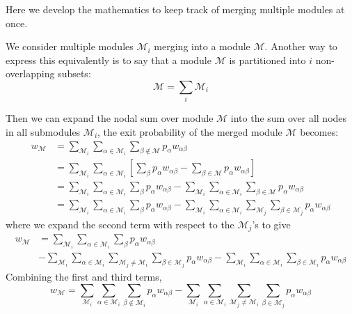 \documentclass[12pt,a4paper]{article}
\begin{document}
Here we develop the mathematics to keep track of merging multiple modules at once.

We consider multiple modules \(\mathcal{M}_i\) merging into a module \(\mathcal{M}\). Another way to express this equivalently is to say that a module \(\mathcal{M}\) is partitioned into \(i\) non-overlapping subsets:
\begin{equation}
    \mathcal{M} = \sum_i \mathcal{M}_i
\end{equation}

Then we can expand the nodal sum over module \(\mathcal{M}\) into the sum over all nodes in all submodules \(\mathcal{M}_i\), the exit probability of the merged module \(\mathcal{M}\) becomes:
\begin{align}
    w_\mathcal{M} &= \sum_{\mathcal{M}_i} \sum_{\alpha\in\mathcal{M}_i} \sum_{\beta\notin\mathcal{M}} p_\alpha w_{\alpha\beta} \\
    &= \sum_{\mathcal{M}_i} \sum_{\alpha\in\mathcal{M}_i} \left[ \sum_\beta p_\alpha w_{\alpha\beta} -\sum_{\beta\in\mathcal{M}} p_\alpha w_{\alpha\beta} \right] \\
    &= \sum_{\mathcal{M}_i} \sum_{\alpha\in\mathcal{M}_i} \sum_\beta p_\alpha w_{\alpha\beta} -\sum_{\mathcal{M}_i} \sum_{\alpha\in\mathcal{M}_i} \sum_{\beta\in\mathcal{M}} p_\alpha w_{\alpha\beta} \\
    &= \sum_{\mathcal{M}_i} \sum_{\alpha\in\mathcal{M}_i} \sum_\beta p_\alpha w_{\alpha\beta} -\sum_{\mathcal{M}_i} \sum_{\alpha\in\mathcal{M}_i} \sum_{\mathcal{M}_j}\sum_{\beta\in\mathcal{M}_j} p_\alpha w_{\alpha\beta}
\end{align}
where we expand the second term with respect to the \(\mathcal{M}_j\)'s to give
\begin{align}
    w_\mathcal{M} &= \sum_{\mathcal{M}_i} \sum_{\alpha\in\mathcal{M}_i} \sum_\beta p_\alpha w_{\alpha\beta} \\
    &-\sum_{\mathcal{M}_i} \sum_{\alpha\in\mathcal{M}_i} \sum_{\mathcal{M}_j\neq\mathcal{M}_i}\sum_{\beta\in\mathcal{M}_j} p_\alpha w_{\alpha\beta} -\sum_{\mathcal{M}_i} \sum_{\alpha\in\mathcal{M}_i} \sum_{\beta\in\mathcal{M}_i} p_\alpha w_{\alpha\beta}
\end{align}
Combining the first and third terms,
\begin{equation}
    w_\mathcal{M} = \sum_{\mathcal{M}_i} \sum_{\alpha\in\mathcal{M}_i} \sum_{\beta\notin\mathcal{M}_i} p_\alpha w_{\alpha\beta} -\sum_{\mathcal{M}_i} \sum_{\alpha\in\mathcal{M}_i} \sum_{\mathcal{M}_j\neq\mathcal{M}_i}\sum_{\beta\in\mathcal{M}_j} p_\alpha w_{\alpha\beta}
\end{equation}
\end{document}
